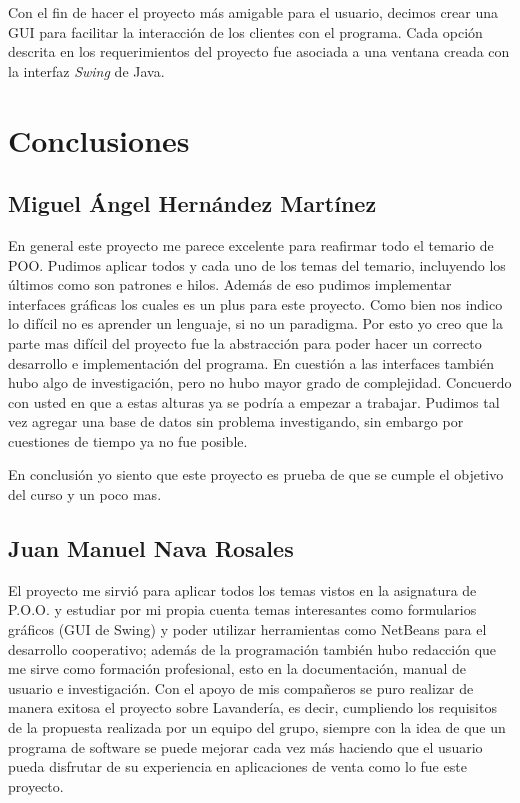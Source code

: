 \documentclass[12pt]{article}
\begin{document}
\par Con el fin de hacer el proyecto más amigable para el usuario, decimos crear una GUI para facilitar la interacción de los clientes con el programa. Cada opción descrita en los requerimientos del proyecto fue asociada a una ventana creada con la interfaz \textit{Swing} de Java.

\section{Conclusiones}

\subsection{Miguel Ángel Hernández Martínez}
En general este proyecto me parece excelente para reafirmar todo el temario de POO. Pudimos aplicar todos y cada uno de los temas del temario, incluyendo los últimos como son patrones e hilos. Además de eso pudimos implementar interfaces gráficas los cuales es un plus para este proyecto. Como bien nos indico lo difícil no es aprender un lenguaje, si no un paradigma. Por esto yo creo que la parte mas difícil del proyecto fue la abstracción para poder hacer un correcto desarrollo e implementación del programa. En cuestión a las interfaces también hubo algo de investigación, pero no hubo mayor grado de complejidad. Concuerdo con usted en que a estas alturas ya se podría a empezar a trabajar. Pudimos tal vez agregar una base de datos sin problema investigando, sin embargo por cuestiones de tiempo ya no fue posible.  

\par En conclusión yo siento que este proyecto es prueba de que se cumple el objetivo del curso y un poco mas. 

\subsection{Juan Manuel Nava Rosales}
El proyecto me sirvió para aplicar todos los temas vistos en la asignatura de P.O.O. y estudiar por mi propia cuenta temas interesantes como formularios gráficos (GUI de Swing) y poder utilizar herramientas como NetBeans para el desarrollo cooperativo; además de la programación también hubo redacción que me sirve como formación profesional, esto en la documentación, manual de usuario e investigación. Con el apoyo de mis compañeros se puro realizar de manera exitosa el proyecto sobre Lavandería, es decir, cumpliendo los requisitos de la propuesta realizada por un equipo del grupo, siempre con la idea de que un programa de software se puede mejorar cada vez más haciendo que el usuario pueda disfrutar de su experiencia en aplicaciones de venta como lo fue este proyecto.
\end{document}

